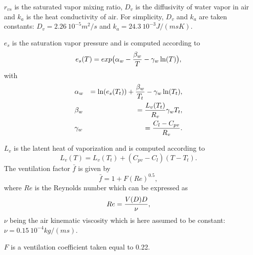 $r_{vs}$ is the saturated vapor mixing ratio, $D_v$ is the diffusivity of water
vapor in air and $k_a$ is the heat conductivity of air.
For simplicity, $D_v$ and  $k_a$ are taken constants:
$D_v=2.26\ 10^{-5} m^2/s$ and $k_a= 24.3 \ 10 ^{-3} J/(msK)$.

$e_s$ is the saturation vapor pressure and is computed according to
\begin{equation}
\label{eq21}
e_s(T)= exp \big( \alpha_w - {\beta_w \over T} - \gamma_w \ln (T) \big),
\end{equation}
with
\begin{eqnarray}
&\alpha_w   &= \ln (e_s(T_t))+{\beta_w \over T_t} - \gamma_w \ln (T_t), \\
&\beta_w   &= {L_v(T_t) \over R_v}\gamma_w T_t, \\
&\gamma_w  &= {C_l -C_{pv} \over R_v}.
\end{eqnarray}

$L_v$ is the latent heat of vaporization and is computed according to
\begin{equation}
L_v(T) = L_v(T_t) + (C_{pv} - C_l)(T-T_t).
\end{equation}
The ventilation factor $\bar f$ is given by
\begin{equation}
\bar f = 1 + F (Re) ^{0.5},\label{eq26}
\end{equation}
where $Re$ is the Reynolds number which can be expressed as
\begin{equation}
Re= {V(D) D \over \nu}, \label{eq27}
\end{equation}
$\nu$  being  the air kinematic viscosity which is here assumed to be constant:
$\nu=0.15 \ 10^{-4} kg/(ms)$.

$F$ is a ventilation coefficient taken equal to 0.22.

